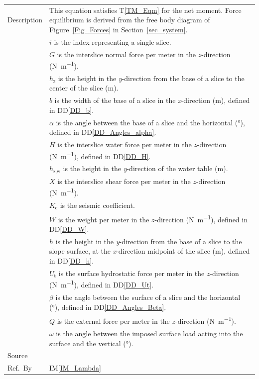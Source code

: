 \documentclass[12pt]{article}
\newcommand{\colAwidth}{0.13\textwidth}
\newcommand{\colBwidth}{0.82\textwidth}
\newcommand{\tref}[1]{T\ref{#1}}
\newcommand{\iref}[1]{IM\ref{#1}}
\newcommand{\ddref}[1]{DD\ref{#1}}
\begin{document}
\begin{minipage}{\textwidth}
\begin{tabular}{| p{\colAwidth} | p{\colBwidth}|}
 \hline Description & This equation satisfies \tref{TM_Eqm} for the net moment. 
 Force equilibrium is derived from the free body diagram of 
 Figure~\ref{Fig_Forces} in Section~\ref{sec_system}.\\
 &$i$ is the index representing a single slice.\\
 &$G$ is the interslice normal force per meter in the $z$-direction 
 (\si{\newton\per\meter}). \\
 &$h_\text{z}$ is the height in the \textit{y}-direction from the base of a 
 slice to the center of the slice (\si{\meter}).\\
 &$b$ is the width of the base of a slice in the \textit{x}-direction 
 (\si{\meter}), defined in \ddref{DD_b}.\\
 &$\alpha$ is the angle between the base of a slice and the 
 horizontal (\si{\degree}), defined in \ddref{DD_Angles_alpha}. \\
 &$H$ is the interslice water force per meter in the $z$-direction 
 (\si{\newton\per\meter}), defined in 
 \ddref{DD_H}. \\
 &$h_\text{z,w}$ is the height in the \textit{y}-direction of the water table 
 (\si{\meter}).\\
 &$X$ is the interslice shear force per meter in the $z$-direction 
 (\si{\newton\per\meter}). \\
 &$K_\text{c}$ is the seismic coefficient. \\
 &$W$ is the weight per meter in the $z$-direction (\si{\newton\per\meter}), 
 defined in \ddref{DD_W}. \\
 &$h$ is the height in the \textit{y}-direction from the base of a slice 
 to the slope surface, at the \textit{x}-direction midpoint of the slice 
 (\si{\meter}), defined in \ddref{DD_h}.\\
 &$U_\text{t}$ is the surface hydrostatic force per meter in the $z$-direction 
 (\si{\newton\per\meter}), 
 defined in \ddref{DD_Ut}. \\
 &$\beta$ is the angle between the surface of a slice and the 
 horizontal (\si{\degree}), defined in \ddref{DD_Angles_Beta}. \\
 &$Q$ is the external force per meter in the $z$-direction 
 (\si{\newton\per\meter}). \\
 &$\omega$ is the angle between the imposed surface load acting into 
 the surface and the vertical (\si{\degree}). \\

  \hline Source & \cite{ZhuEtAl2005}\\
  
  \hline Ref.\ By & \iref{IM_Lambda}\\
  
  \hline
\end{tabular}
\end{minipage}\\
\end{document}

